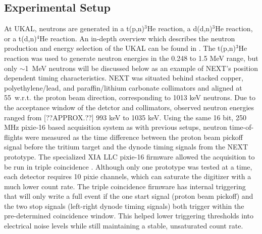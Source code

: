 \subsection{Experimental Setup}
At UKAL, neutrons are generated in a t(p,n)$^{3}$He reaction, a d(d,n)$^{3}$He reaction, or a t(d,n)$^4$He reaction. An in-depth overview which describes the neutron production and energy selection of the UKAL can be found in \cite{HARTMAN2015137}. The t(p,n)$^{3}$He reaction was used to generate neutron energies in the 0.248 to 1.5 MeV range, but only $\sim$1~MeV neutrons will be discussed below as an example of NEXT's position dependent timing characteristics. NEXT was situated behind stacked copper, polyethylene/lead, and paraffin/lithium carbonate collimators and aligned at 55\textdegree~w.r.t. the proton beam direction, corresponding to 1013 keV neutrons. Due to the acceptance window of the detctor and collimators, observed neutron energies ranged from [??APPROX.??] 993 keV to 1035 keV.  Using the same 16 bit, 250 MHz pixie-16 based acquisition system as with previous setups, neutron time-of-flights were measured as the time difference between the proton beam pickoff signal before the tritium target and the dynode timing signals from the NEXT prototype. The specialized XIA LLC\textsuperscript{\textregistered} pixie-16 firmware allowed the acquisition to be run in triple coincidence \cite{PAULAUSKAS201422}. Although only one prototype was tested at a time, each detector requires 10 pixie channels, which can saturate the digitizer with a much lower count rate. The triple coincidence firmware has internal triggering that will only write a full event if the one start signal (proton beam pickoff) and the two stop signals (left-right dynode timing signals) both trigger within the pre-determined coincidence window. This helped lower triggering thresholds into electrical noise levels while still maintaining a stable, unsaturated count rate.

